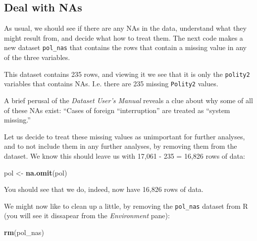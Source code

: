 \documentclass[]{book}
\newenvironment{Shaded}{\begin{snugshade}}{\end{snugshade}}
\newcommand{\KeywordTok}[1]{\textcolor[rgb]{0.13,0.29,0.53}{\textbf{#1}}}
\newcommand{\NormalTok}[1]{#1}
\newcommand{\OperatorTok}[1]{\textcolor[rgb]{0.81,0.36,0.00}{\textbf{#1}}}
\newcommand{\StringTok}[1]{\textcolor[rgb]{0.31,0.60,0.02}{#1}}
\begin{document}
\hypertarget{deal-with-nas}{%
\subsection{Deal with NAs}\label{deal-with-nas}}

As usual, we should see if there are any NAs in the data, understand what they might result from, and decide what how to treat them. The next code makes a new dataset \texttt{pol\_nas} that contains the rows that contain a missing value in any of the three variables.

\begin{Shaded}
\end{Shaded}

This dataset contains 235 rows, and viewing it we see that it is only the \texttt{polity2} variables that contains NAs. I.e. there are 235 missing \texttt{Polity2} values.

A brief perusal of the \emph{Dataset User's Manual} reveals a clue about why some of all of these NAs exist: ``Cases of foreign ``interruption'' are treated as ``system missing.''

Let us decide to treat these missing values as unimportant for further analyses, and to not include them in any further analyses, by removing them from the dataset. We know this should leave us with 17,061 - 235 = 16,826 rows of data:

\begin{Shaded}
\begin{Highlighting}[]
\NormalTok{pol <-}\StringTok{ }\KeywordTok{na.omit}\NormalTok{(pol)}
\end{Highlighting}
\end{Shaded}

You should see that we do, indeed, now have 16,826 rows of data.

We might now like to clean up a little, by removing the \texttt{pol\_nas} dataset from R (you will see it dissapear from the \emph{Environment} pane):

\begin{Shaded}
\begin{Highlighting}[]
\KeywordTok{rm}\NormalTok{(pol_nas)}
\end{Highlighting}
\end{Shaded}
\end{document}
